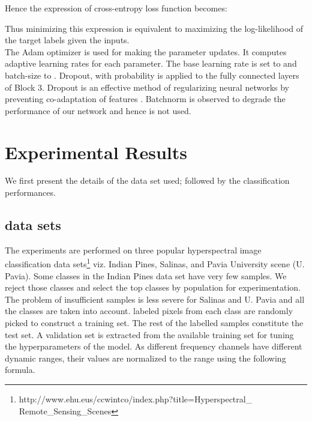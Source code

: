 \documentclass[journal]{IEEEtran}
\begin{document}
Hence the expression of cross-entropy loss function becomes:



Thus minimizing this expression is equivalent to maximizing the log-likelihood of the target labels given the inputs.\\

The Adam optimizer \cite{Kingma:2015} is used for making the parameter updates. It computes adaptive learning rates for each parameter. The base learning rate is set to  and batch-size to . Dropout, with probability  is applied to the fully connected layers of Block 3. Dropout is an effective method of regularizing neural networks by preventing co-adaptation of features \cite{Srivastava:2014}. Batchnorm \cite{Ioffe:2015} is observed to degrade the performance of our network and hence is not used.

\section{Experimental Results}
\label{sec:results}
We first present the details of the data set used; followed by the classification performances.

\subsection{data sets}
\label{sec:data sets}
The experiments are performed on three popular hyperspectral image classification data sets\footnote{http://www.ehu.eus/ccwintco/index.php?title=Hyperspectral\_ Remote\_Sensing\_Scenes} viz. Indian Pines, Salinas, and Pavia University scene (U. Pavia). Some classes in the Indian Pines data set have very few samples. We reject those classes and select the top  classes by population for experimentation. The problem of insufficient samples is less severe for Salinas and U. Pavia and all the classes are taken into account.  labeled pixels from each class are randomly picked to construct a training set. The rest of the labelled samples constitute the test set. A validation set is extracted from the available training set for tuning the hyperparameters of the model. As different frequency channels have different dynamic ranges, their values are normalized to the range  using the following formula. 
\end{document}
